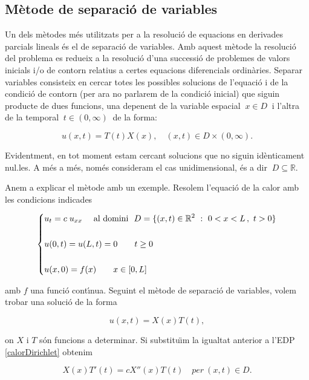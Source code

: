 \documentclass[12pt]{article}
\newcommand{\R}{\mathbb{R}}
\begin{document}
\subsection{M{\`e}tode de separaci{\'o} de variables}

Un dels m{\`e}todes m{\'e}s utilitzats per a la resoluci{\'o} de  equacions en derivades parcials lineals {\'e}s el de
separaci{\'o} de variables. Amb aquest m{\`e}tode la resoluci{\'o} del problema es redueix a la resoluci{\'o} d'una successi{\'o}
de problemes de valors inicials i/o de contorn relatius a certes equacions diferencials ordin{\`a}ries. Separar variables consisteix en cercar totes les possibles solucions de l'equaci{\'o} i de la condici{\'o} de contorn (per ara no parlarem de la condici{\'o} inicial) que siguin producte de dues funcions,
una depenent de la variable espacial $\ x\in D\ $ i l'altra de la temporal $\ t \in(0,\infty)\ $ de la forma:

\[
 u(x,t)=T(t)X(x),\quad (x,t)\in D\times (0,\infty).
\]

Evidentment, en tot moment estam cercant solucions que no siguin id{\`e}nticament nul.les. A m{\'e}s a m{\'e}s,
nom{\'e}s consideram el cas unidimensional, {\'e}s a dir $\ D\subseteq \R.$

Anem a explicar el m{\`e}tode amb un exemple. Resolem l'equaci{\'o} de la calor amb les condicions indicades

\vspace{0.4cm}
\begin{equation}\label{calorDirichlet}
\left\{ \vspace{0.4cm}\begin{split}
&u_t=c\;u_{xx}\quad \hbox{ al domini } \ D=\{(x,t)\in\R^2\ :\  0<x<L\,,\ t>0\}\\
\\
&u(0,t)=u(L,t)=0 \qquad t\geq 0\\
\\
&u(x,0)=f(x) \qquad x\in[0,L]
 \end{split}\right.
\end{equation}

amb $f$ una funci{\'o} cont{\'\i}nua. Seguint el m{\`e}tode de separaci{\'o} de variables, volem trobar una soluci{\'o} de la forma

\[
 u(x,t)=X(x)T(t),
\]

on $X$ i $T$ s{\'o}n funcions a determinar. Si substitu{\"\i}m la igualtat anterior a l'EDP \eqref{calorDirichlet} obtenim

\[
 X(x)T'(t)=c X''(x)T(t)\quad per\ (x,t)\in D.
\]
\end{document}
